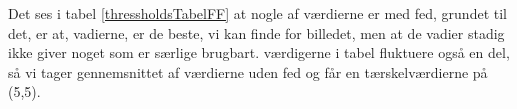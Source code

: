 Det ses i tabel \ref{thressholdsTabelFF} at nogle af værdierne er med
fed, grundet til det, er at, vadierne, er de beste, vi kan finde for
billedet, men at de vadier stadig ikke giver noget som er særlige
brugbart. værdigerne i tabel fluktuere også en del, så vi tager
gennemsnittet af værdierne uden fed og får en tærskelværdierne på (5,5).
